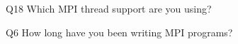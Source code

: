 \begin{description}%
\item{Q18} Which MPI thread support are you using?%
\item{Q6} How long have you been writing MPI programs?%
\end{description}%
